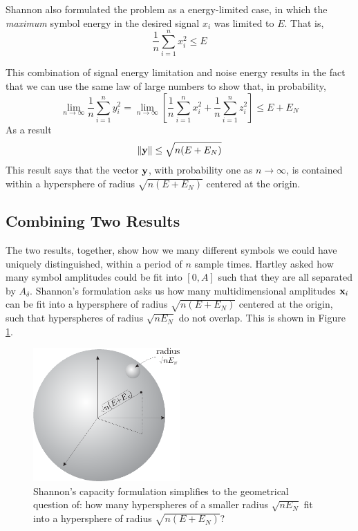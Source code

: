 Shannon also formulated the problem as a energy-limited case, in
which the \emph{maximum} symbol energy in the desired signal $x_i$
was limited to $E$. That is,
\[
  \frac{1}{n} \sum_{i=1}^n x_i^2 \le E
\]

This combination of signal energy limitation and noise energy
results in the fact that we can use the same law of large numbers to show that, in probability,
\[
  \lim_{n\rightarrow \infty} 
     \frac{1}{n} \sum_{i=1}^n y_i^2 
  = \lim_{n\rightarrow \infty} 
  \left[ 
     \frac{1}{n} \sum_{i=1}^n x_i^2 + \frac{1}{n} \sum_{i=1}^n z_i^2 \right] \le E + E_N
\]
As a result
\[
  \|\mathbf{y}\| \le \sqrt{n(E + E_N)}
\]
This result says that the vector $\mathbf{y}$, with probability one as
$n\rightarrow \infty$, is contained within a hypersphere of radius
$\sqrt{n(E + E_N)}$ centered at the origin.

\subsection{Combining Two Results}
The two results, together, show how we many different symbols we
could have uniquely distinguished, within a period of $n$ sample
times.  Hartley asked how many symbol amplitudes could be fit into
$[0, A]$ such that they are all separated by $A_\delta$.  Shannon's
formulation asks us how many multidimensional amplitudes $\mathbf{x}_i$
can be fit into a hypersphere of radius $\sqrt{n(E + E_N)}$ centered
at the origin, such that hyperspheres of radius $\sqrt{nE_N}$ do not
overlap.  This is shown in Figure \ref{F:sphere_in_sphere}.

\begin{figure}[htbp]
  \centerline{\includegraphics[width=0.5\textwidth]{../images/sphere_in_sphere.eps}}
  \caption{Shannon's capacity formulation simplifies to the geometrical question of: how many hyperspheres of a smaller radius $\sqrt{nE_N}$ fit into a hypersphere of radius $\sqrt{n(E + E_N)}$?}
  \label{F:sphere_in_sphere}
\end{figure}


